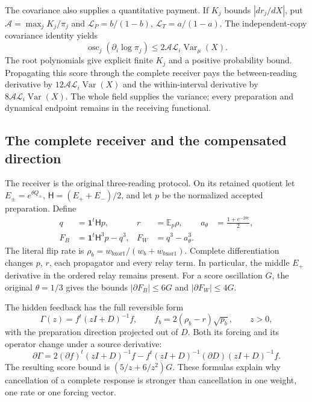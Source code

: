 The covariance also supplies a quantitative payment. If $K_j$ bounds $|dr_j/dX|$, put $\mathcal A=\max_jK_j/\pi_j$ and $\mathcal L_P=b/(1-b)$, $\mathcal L_T=a/(1-a)$. The independent-copy covariance identity yields
\begin{equation}
 \operatorname{osc}_j(\partial_i\log\pi_j)
 \leq2\mathcal A\mathcal L_i\operatorname{Var}_\mu(X).
\end{equation}
The root polynomials give explicit finite $K_j$ and a positive probability bound. Propagating this score through the complete receiver pays the between-reading derivative by $12\mathcal A\mathcal L_i\operatorname{Var}(X)$ and the within-interval derivative by $8\mathcal A\mathcal L_i\operatorname{Var}(X)$. The whole field supplies the variance; every preparation and dynamical endpoint remains in the receiving functional.

\subsection{The complete receiver and the compensated direction}

The receiver is the original three-reading protocol. On its retained quotient let $E_\pm=e^{\theta Q_\pm}$, $\mathsf H=(E_++E_-)/2$, and let $p$ be the normalized accepted preparation. Define
\begin{align}
 q&=\mathbf1^t\mathsf H p,
 &r&=\mathbb E_p\rho,
 &a_\theta&=\frac{1+e^{-2\theta r}}2,\\
 F_B&=\mathbf1^t\mathsf H^3p-q^3,
 &F_W&=q^3-a_\theta^3.
\end{align}
The literal flip rate is $\rho_b=w_{b\mathbin{\mathrm{xor}}1}/(w_b+w_{b\mathbin{\mathrm{xor}}1})$. Complete differentiation changes $p$, $r$, each propagator and every relay term. In particular, the middle $E_+$ derivative in the ordered relay remains present. For a score oscillation $G$, the original $\theta=1/3$ gives the bounds $|\partial F_B|\leq6G$ and $|\partial F_W|\leq4G$.

The hidden feedback has the full reversible form
\begin{equation}
 \Gamma(z)=f^t(zI+D)^{-1}f,\qquad
 f_b=2(\rho_b-r)\sqrt{p_b},\qquad z>0,
\end{equation}
with the preparation direction projected out of $D$. Both its forcing and its operator change under a source derivative:
\begin{equation}
 \partial\Gamma
 =2(\partial f)^t(zI+D)^{-1}f
 -f^t(zI+D)^{-1}(\partial D)(zI+D)^{-1}f.
\end{equation}
The resulting score bound is $(5/z+6/z^2)G$. These formulas explain why cancellation of a complete response is stronger than cancellation in one weight, one rate or one forcing vector.

